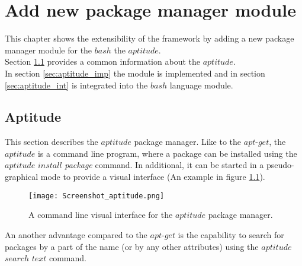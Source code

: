 
\chapter{Add new package manager module}\label{chap:add}
This chapter shows the extensibility of the framework by adding a new package manager module for the $bash$ the $aptitude$.\\
Section \ref{sec:aptitude} provides a common information about the $aptitude$.\\
In section \ref{sec:aptitude_imp} the module is implemented and in section \ref{sec:aptitude_int} is integrated into the $bash$ language module.

\section{Aptitude}\label{sec:aptitude}
This section describes the $aptitude$ package manager.
Like to the $apt$-$get$, the $aptitude$ is a command line program, where a package can be installed using the $aptitude$ $install$ \emph{package} command. 
In additional, it can be started in a pseudo-graphical mode to provide a visual interface (An example in figure \ref{fig:aptitude_gui}).
\begin{figure}[ht]   
	\centering
	\texttt{[image: Screenshot\_aptitude.png]}
	\caption{A command line visual interface for the $aptitude$ package manager.}
	\label{fig:aptitude_gui}
\end{figure}
An another advantage compared to the $apt$-$get$ is the capability to search for packages by a part of the name (or by any other attributes) using the $aptitude$ $search$ $text$ command.
